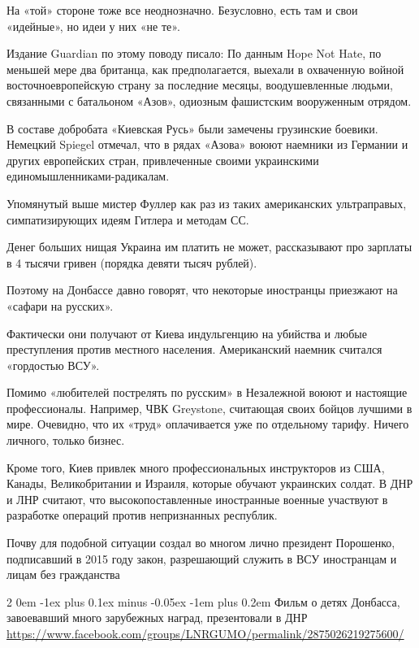 \documentclass[a4paper,11pt]{extreport}
\makeatletter
\renewcommand\subsection{%
  \clearpage
    \@startsection{subsection}%
    {2}%
    {0em}%
    {-1ex plus 0.1ex minus -0.05ex}%
    {-1em plus 0.2em}%
    {\scshape\bfseries\Large}%
}
\makeatother
\begin{document}
На «той» стороне тоже все неоднозначно.  Безусловно, есть там и свои «идейные»,
но идеи у них «не те».

Издание Guardian по этому поводу писало: По данным Hope Not Hate, по меньшей
мере два британца, как предполагается, выехали в охваченную войной
восточноевропейскую страну за последние месяцы, воодушевленные людьми,
связанными с батальоном «Азов», одиозным фашистским вооруженным отрядом.

В составе добробата «Киевская Русь» были замечены грузинские боевики.  Немецкий
Spiegel отмечал, что в рядах «Азова» воюют наемники из Германии и других
европейских стран, привлеченные своими украинскими единомышленниками-радикалам.

Упомянутый выше мистер Фуллер как раз из таких американских ультраправых,
симпатизирующих идеям Гитлера и методам СС.

Денег больших нищая Украина им платить не может, рассказывают про зарплаты в 4
тысячи гривен (порядка девяти тысяч рублей).

Поэтому на Донбассе давно говорят, что некоторые иностранцы приезжают на
«сафари на русских».

Фактически они получают от Киева индульгенцию на убийства и любые преступления
против местного населения. Американский наемник считался «гордостью ВСУ».

Помимо «любителей пострелять по русским» в Незалежной воюют и настоящие
профессионалы. Например, ЧВК Greystone, считающая своих бойцов лучшими в мире.
Очевидно, что их «труд» оплачивается уже по отдельному тарифу.  Ничего личного,
только бизнес.

Кроме того, Киев привлек много профессиональных инструкторов из США, Канады,
Великобритании и Израиля, которые обучают украинских солдат. В ДНР и ЛНР
считают, что высокопоставленные иностранные военные участвуют в разработке
операций против непризнанных республик.

Почву для подобной ситуации создал во многом лично президент Порошенко,
подписавший в 2015 году закон, разрешающий служить в ВСУ иностранцам и лицам
без гражданства
  
 
 
\subsection{Фильм о детях Донбасса, завоевавший много зарубежных наград, презентовали в ДНР}
\label{sec:25_07_2020.fb.lnr.3}
\url{https://www.facebook.com/groups/LNRGUMO/permalink/2875026219275600/}
\end{document}
